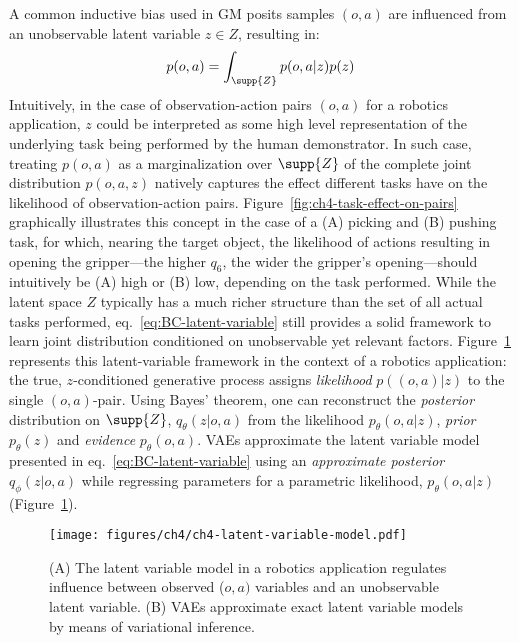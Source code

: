 A common inductive bias used in GM posits samples \( (o,a) \) are influenced from an unobservable latent variable \( z \in Z \), resulting in:
\begin{equation}\label{eq:BC-latent-variable}
    p (o,a) = \int_{\supp{Z}} p(o,a \vert z) p(z)
\end{equation}
Intuitively, in the case of observation-action pairs \( (o, a) \) for a robotics application, \( z \) could be interpreted as some high level representation of the underlying task being performed by the human demonstrator.
In such case, treating \( p(o,a) \) as a marginalization over \( \supp{Z} \) of the complete joint distribution \( p(o,a,z) \) natively captures the effect different tasks have on the likelihood of observation-action pairs.
Figure~\ref{fig:ch4-task-effect-on-pairs} graphically illustrates this concept in the case of a (A) picking and (B) pushing task, for which, nearing the target object, the likelihood of actions resulting in opening the gripper---the higher \( q_6 \), the wider the gripper's opening---should intuitively be (A) high or (B) low, depending on the task performed.
While the latent space \( Z \) typically has a much richer structure than the set of all actual tasks performed, eq.~\ref{eq:BC-latent-variable} still provides a solid framework to learn joint distribution conditioned on unobservable yet relevant factors.
Figure~\ref{fig:ch4-latent-variable-model} represents this latent-variable framework in the context of a robotics application: the true, \( z \)-conditioned generative process assigns \emph{likelihood} \( p((o,a) \vert z) \) to the single \( (o,a) \)-pair.
Using Bayes' theorem, one can reconstruct the \emph{posterior} distribution on \( \supp{Z} \), \( q_\theta(z \vert o,a) \) from the likelihood \( p_\theta(o,a \vert z) \), \emph{prior} \( p_\theta(z) \) and \emph{evidence} \( p_\theta(o,a) \).
VAEs approximate the latent variable model presented in eq.~\ref{eq:BC-latent-variable} using an \emph{approximate posterior} \(q_\phi(z \vert o,a) \) while regressing parameters for a parametric likelihood, \( p_\theta(o,a \vert z) \) (Figure~\ref{fig:ch4-latent-variable-model}).

\begin{figure}
    \centering
    \texttt{[image: figures/ch4/ch4-latent-variable-model.pdf]}
    \caption{(A) The latent variable model in a robotics application regulates influence between observed (\(o,a) \) variables and an unobservable latent variable. (B) VAEs approximate exact latent variable models by means of variational inference. }
    \label{fig:ch4-latent-variable-model}
\end{figure}

